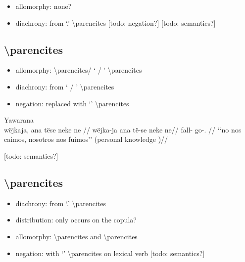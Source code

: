 \documentclass{memoir}
\begin{document}
\begin{itemize}
\tightlist
\item
  allomorphy: none?
\item
  diachrony: from  `.'
  \textbackslash parencites {[}todo: negation?{]} {[}todo: semantics?{]}
\end{itemize}

\subsection{\texorpdfstring{
\textbackslash parencites}{ \textbackslash parencites}}

\begin{itemize}
\tightlist
\item
  allomorphy:  \textbackslash parencites/ `
  / ' \textbackslash parencites
\item
  diachrony: from  ` / '
  \textbackslash parencites
\item
  negation: replaced with  `' \textbackslash parencites
\end{itemize}

\ex  Yawarana  \\\label{conv1stenc-28}
\begingl \glpreamble wëjkaja, ana tëse neke ne //
\gla wëjka-ja ana të-se neke ne//
\glb fall-  go-.  //
\glft ‘‘no nos caimos, nosotros nos fuimos’’ (personal knowledge
)//
\endgl
\xe

{[}todo: semantics?{]}

\subsection{\texorpdfstring{
\textbackslash parencites}{ \textbackslash parencites}}

\begin{itemize}
\tightlist
\item
  diachrony: from  `.'
  \textbackslash parencites
\item
  distribution: only occurs on the copula?
\item
  allomorphy:  \textbackslash parencites and 
  \textbackslash parencites
\item
  negation: with  `' \textbackslash parencites on
  lexical verb  {[}todo:
  semantics?{]}
\end{itemize}
\end{document}

